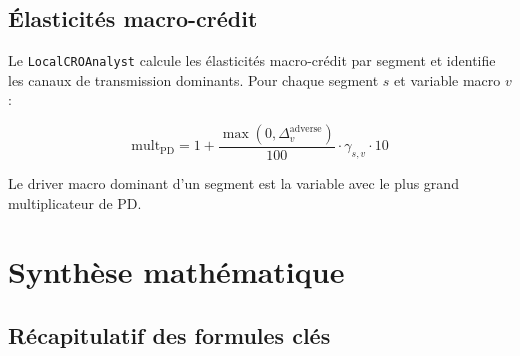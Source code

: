 \documentclass[12pt,a4paper]{article}
\begin{document}
\subsection{\'Elasticit\'es macro-cr\'edit}

Le \texttt{LocalCROAnalyst} calcule les \'elasticit\'es macro-cr\'edit par segment
et identifie les canaux de transmission dominants. Pour chaque segment $s$
et variable macro $v$ :

\begin{equation}
    \text{mult}_{\text{PD}} = 1 + \frac{\max(0, \Delta_v^{\text{adverse}})}{100}
    \cdot \gamma_{s,v} \cdot 10
    \label{eq:pd_mult}
\end{equation}

Le driver macro dominant d'un segment est la variable avec le plus grand
multiplicateur de PD.


\newpage
\section{Synth\`ese math\'ematique}

\subsection{R\'ecapitulatif des formules cl\'es}
\end{document}
